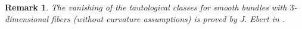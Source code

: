 \documentclass[onecolumn,notitlepage,11pt]{article}
\newcommand{\Q}{\mathbb{Q}}
\newcommand{\R}{\mathbb{R}}
\newcommand{\bra}{\left\langle}
\newcommand{\ket}{\right\rangle}
\newcommand{\beq}{\begin{equation*}}
\newcommand{\eeq}{\end{equation*}}
\newtheorem{rmk}{Remark}
\theoremstyle{definition}
\begin{document}
\begin{rmk}
The vanishing of the tautological classes for smooth bundles with
$3$-dimensional fibers (without curvature assumptions) is proved
by J. Ebert in \cite{ebert}.
\end{rmk}
%
\end{document}
